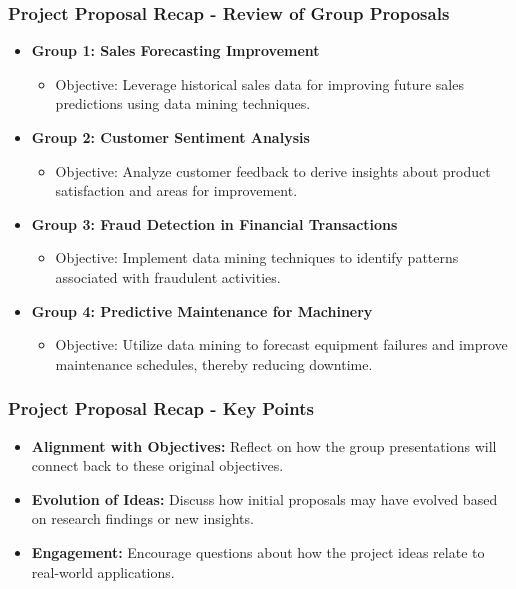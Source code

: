 \documentclass[aspectratio=169]{beamer}
\begin{document}
\begin{frame}[fragile]
    \frametitle{Project Proposal Recap - Review of Group Proposals}
    \begin{itemize}
        \item \textbf{Group 1: Sales Forecasting Improvement}
        \begin{itemize}
            \item Objective: Leverage historical sales data for improving future sales predictions using data mining techniques.
        \end{itemize}
        
        \item \textbf{Group 2: Customer Sentiment Analysis}
        \begin{itemize}
            \item Objective: Analyze customer feedback to derive insights about product satisfaction and areas for improvement.
        \end{itemize}
        
        \item \textbf{Group 3: Fraud Detection in Financial Transactions}
        \begin{itemize}
            \item Objective: Implement data mining techniques to identify patterns associated with fraudulent activities.
        \end{itemize}

        \item \textbf{Group 4: Predictive Maintenance for Machinery}
        \begin{itemize}
            \item Objective: Utilize data mining to forecast equipment failures and improve maintenance schedules, thereby reducing downtime.
        \end{itemize}
    \end{itemize}
\end{frame}

\begin{frame}[fragile]
    \frametitle{Project Proposal Recap - Key Points}
    \begin{itemize}
        \item \textbf{Alignment with Objectives:} Reflect on how the group presentations will connect back to these original objectives.
        \item \textbf{Evolution of Ideas:} Discuss how initial proposals may have evolved based on research findings or new insights.
        \item \textbf{Engagement:} Encourage questions about how the project ideas relate to real-world applications.
    \end{itemize}
\end{frame}
\end{document}
